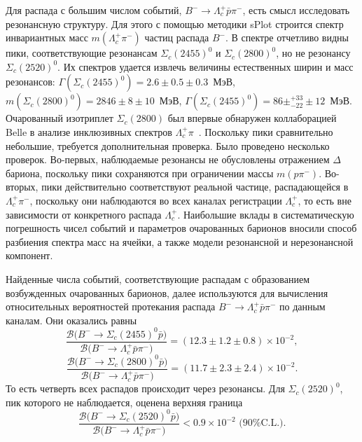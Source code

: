 \documentclass[a4paper, 12pt]{article}
\begin{document}
Для распада с большим числом событий, $B^-\to\Lambda_c^+\bar{p}\pi^-$, 
есть смысл исследовать резонансную структуру. Для этого с помощью 
методики sPlot строится спектр инвариантных масс $m(\Lambda_c^+\pi^-)$ 
частиц распада $B^-$. В спектре отчетливо видны пики, соответствующие 
резонансам $\Sigma_c(2455)^0$ и $\Sigma_c(2800)^0$, но не резонансу 
$\Sigma_c(2520)^0$. Их спектров удается извлечь величины естественных 
ширин и масс резонансов:
$\Gamma(\Sigma_c(2455)^0) = 2.6 \pm 0.5 \pm 0.3$~МэВ,
$m(\Sigma_c(2800)^0) = 2846 \pm 8 \pm 10$~МэВ,
$\Gamma(\Sigma_c(2455)^0) = 86 \pm^{+33}_{-22} \pm 12$~МэВ.
%
Очарованный изотриплет $\Sigma_c(2800)$ был впервые обнаружен 
коллаборацией Belle в анализе инклюзивных спектров 
$\Lambda_c^+\pi$~\cite{5-belle-sc}.
%
Поскольку пики сравнительно небольшие, требуется дополнительная 
проверка. Было проведено несколько проверок. Во-первых, наблюдаемые 
резонансы не обусловлены отражением $\Delta$ бариона, поскольку пики 
сохраняются при ограничении массы $m(p\pi^-)$. Во-вторых, пики 
действительно соответствуют реальной частице, распадающейся 
в $\Lambda_c^+\pi^-$, поскольку они наблюдаются во всех каналах 
регистрации $\Lambda_c^+$, то есть вне зависимости от конкретного 
распада $\Lambda_c^+$.
%
Наибольшие вклады в систематическую погрешность чисел событий 
и параметров очарованных барионов вносили способ разбиения спектра масс 
на ячейки, а также модели резонансной и нерезонансной компонент.

Найденные числа событий, соответствующие распадам с образованием 
возбужденных очарованных барионов, далее используются для вычисления 
относительных вероятностей протекания распада 
$B^-\to\Lambda_c^+\bar{p}\pi^-$ по данным каналам. Они оказались равны
\[\dfrac{\mathcal{B}\big(B^- \to \Sigma_c(2455)^0 \bar{p} \big)}
  {\mathcal{B}\big(B^- \to \Lambda_c^+ \bar{p} \pi^- \big)}
  = \left(12.3 \pm 1.2 \pm 0.8 \right) \times 10^{-2},\]
%
\[\dfrac{\mathcal{B}\big(B^- \to \Sigma_c(2800)^0 \bar{p} \big)}
  {\mathcal{B}\big(B^- \to \Lambda_c^+ \bar{p} \pi^- \big)}
  = \left(11.7 \pm 2.3 \pm 2.4 \right) \times 10^{-2}.\]
%
То есть четверть всех распадов происходит через резонансы. Для 
$\Sigma_c(2520)^0$, пик которого не наблюдается, оценена верхняя граница
%
\[\dfrac{\mathcal{B}\big(B^- \to \Sigma_c(2520)^0 \bar{p} \big)}
  {\mathcal{B}\big(B^- \to \Lambda_c^+ \bar{p} \pi^- \big)}
  < 0.9 \times 10^{-2} \text{ (90\% C.L.)}.\]
\end{document}
